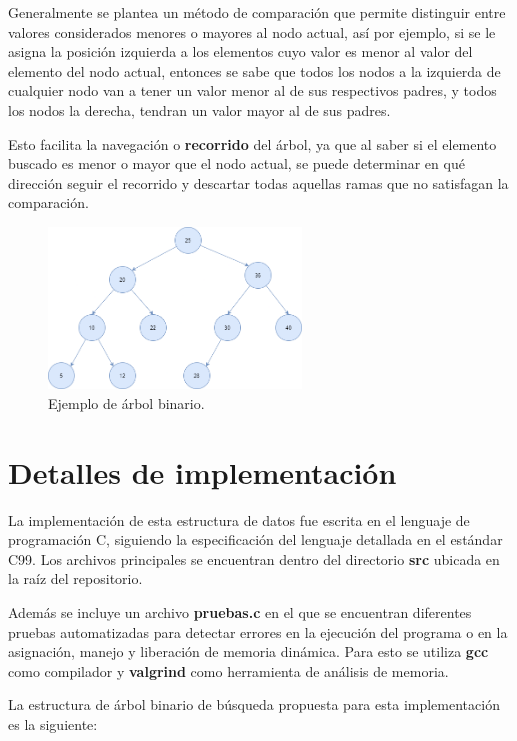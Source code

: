 \documentclass[titlepage,a4paper]{article}
\begin{document}
Generalmente se plantea un método de comparación que permite distinguir entre
valores considerados menores o mayores al nodo actual, así por ejemplo, si se
le asigna la posición izquierda a los elementos cuyo valor es menor al valor
del elemento del nodo actual, entonces se sabe que todos los nodos a la
izquierda de cualquier nodo van a tener un valor menor al de sus respectivos
padres, y todos los nodos la derecha, tendran un valor mayor al de sus padres.

Esto facilita la navegación o \textbf{recorrido} del árbol, ya que al saber si
el elemento buscado es menor o mayor que el nodo actual, se puede determinar
en qué dirección seguir el recorrido y descartar todas aquellas ramas que no
satisfagan la comparación.

\begin{figure}[H]
\centering
\includegraphics[width=0.6\textwidth]{arbol_binario.png}
\caption{\label{fig:seq02}Ejemplo de árbol binario.}
\end{figure}


				 \section{Detalles de implementación}\label{sec:implementacion}

La implementación de esta estructura de datos fue escrita en el lenguaje de
programación C, siguiendo la especificación del lenguaje detallada en el
estándar C99. Los archivos principales se encuentran dentro del directorio
\textbf{src} ubicada en la raíz del repositorio. 

Además se incluye un archivo \textbf{pruebas.c} en el que se encuentran
diferentes pruebas automatizadas para detectar errores en la ejecución del
programa o en la asignación, manejo y liberación de memoria dinámica. Para esto
se utiliza \textbf{gcc} como compilador y \textbf{valgrind} como herramienta de
análisis de memoria.

La estructura de árbol binario de búsqueda propuesta para esta implementación
es la siguiente:
\end{document}
